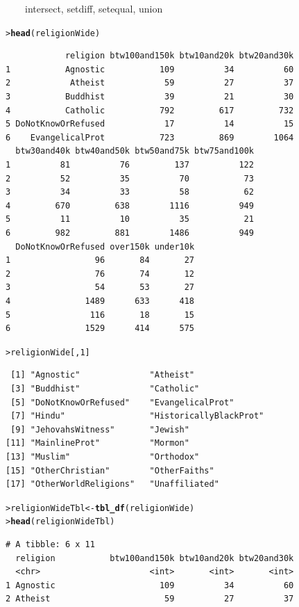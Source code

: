 \documentclass[12pt,oneside]{book}\usepackage[]{graphicx}\usepackage[]{color}
\makeatletter
\newcommand{\hlnum}[1]{\textcolor[rgb]{0.686,0.059,0.569}{#1}}%
\newcommand{\hlstd}[1]{\textcolor[rgb]{0.345,0.345,0.345}{#1}}%
\newcommand{\hlkwb}[1]{\textcolor[rgb]{0.69,0.353,0.396}{#1}}%
\newcommand{\hlkwd}[1]{\textcolor[rgb]{0.737,0.353,0.396}{\textbf{#1}}}%
\newenvironment{kframe}{%
 \def\at@end@of@kframe{}%
 \ifinner\ifhmode%
  \def\at@end@of@kframe{\end{minipage}}%
  \begin{minipage}{\columnwidth}%
 \fi\fi%
 \def\FrameCommand##1{\hskip\@totalleftmargin \hskip-\fboxsep
 \colorbox{shadecolor}{##1}\hskip-\fboxsep
     \hskip-\linewidth \hskip-\@totalleftmargin \hskip\columnwidth}%
 \MakeFramed {\advance\hsize-\width
   \@totalleftmargin\z@ \linewidth\hsize
   \@setminipage}}%
 {\par\unskip\endMakeFramed%
 \at@end@of@kframe}
\newenvironment{knitrout}{}{} %
\makeatother
\begin{document}
\begin{knitrout}
\begin{kframe}
{{\ \ \ \ intersect, setdiff, setequal, union}}\begin{alltt}
\hlstd{> }\hlkwd{head}\hlstd{(religionWide)}
\end{alltt}
\begin{verbatim}
            religion btw100and150k btw10and20k btw20and30k
1           Agnostic           109          34          60
2            Atheist            59          27          37
3           Buddhist            39          21          30
4           Catholic           792         617         732
5 DoNotKnowOrRefused            17          14          15
6    EvangelicalProt           723         869        1064
  btw30and40k btw40and50k btw50and75k btw75and100k
1          81          76         137          122
2          52          35          70           73
3          34          33          58           62
4         670         638        1116          949
5          11          10          35           21
6         982         881        1486          949
  DoNotKnowOrRefused over150k under10k
1                 96       84       27
2                 76       74       12
3                 54       53       27
4               1489      633      418
5                116       18       15
6               1529      414      575
\end{verbatim}
\begin{alltt}
\hlstd{> }\hlstd{religionWide[,} \hlnum{1}\hlstd{]}
\end{alltt}
\begin{verbatim}
 [1] "Agnostic"              "Atheist"              
 [3] "Buddhist"              "Catholic"             
 [5] "DoNotKnowOrRefused"    "EvangelicalProt"      
 [7] "Hindu"                 "HistoricallyBlackProt"
 [9] "JehovahsWitness"       "Jewish"               
[11] "MainlineProt"          "Mormon"               
[13] "Muslim"                "Orthodox"             
[15] "OtherChristian"        "OtherFaiths"          
[17] "OtherWorldReligions"   "Unaffiliated"         
\end{verbatim}
\begin{alltt}
\hlstd{> }\hlstd{religionWideTbl} \hlkwb{<-} \hlkwd{tbl_df}\hlstd{(religionWide)}
\hlstd{> }\hlkwd{head}\hlstd{(religionWideTbl)}
\end{alltt}
\begin{verbatim}
# A tibble: 6 x 11
  religion           btw100and150k btw10and20k btw20and30k
  <chr>                      <int>       <int>       <int>
1 Agnostic                     109          34          60
2 Atheist                       59          27          37

\end{verbatim}
\end{kframe}
\end{knitrout}
\end{document}
